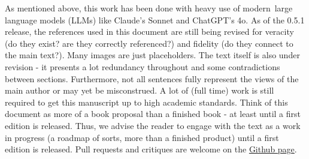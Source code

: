 As mentioned above, this work has been done with heavy use of modern~large language models (LLMs) like Claude's Sonnet and ChatGPT's 4o. As of the 0.5.1 release, the references used in this document are still being revised for veracity (do they exist? are they correctly referenced?) and fidelity (do they connect to the main text?). Many images are just placeholders. The text itself is also under revision - it presents a lot redundancy throughout and some contradictions between sections. Furthermore, not all sentences fully represent the views of the main author or may yet be misconstrued. A lot of (full time) work is still required to get this manuscript up to high academic standards. Think of this document as more of a book proposal than a finished book - at least until a first edition is released. Thus, we advise the reader to engage with the text as a work in progress (a roadmap of sorts, more than a finished product) until a first edition is released. Pull requests and critiques are welcome on the \href{https://github.com/bobaseb/energetically-coherent-computation}{Github page}.
